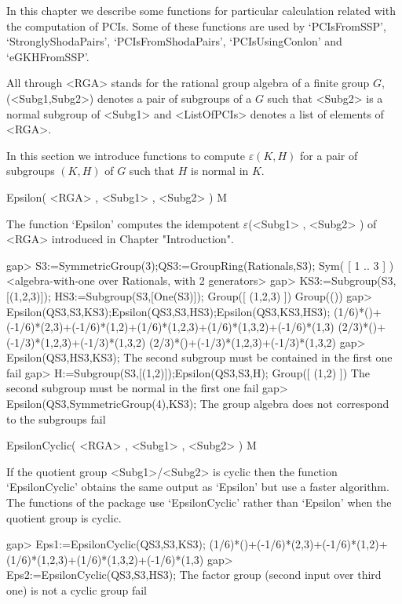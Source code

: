 
In this chapter we describe some functions for particular calculation 
related with the computation of PCIs. Some of these functions are used by 
`PCIsFromSSP', `StronglyShodaPairs', `PCIsFromShodaPairs', `PCIsUsingConlon' and `eGKHFromSSP'. 

All through <RGA> stands for the rational group algebra of a finite group $G$, (<Subg1,Subg2>) 
denotes a pair of subgroups of a $G$ such that <Subg2> is a normal subgroup of <Subg1> 
and <ListOfPCIs> denotes a list of elements of <RGA>. 



In this section we introduce functions to compute $\varepsilon(K,H)$ for a pair of subgroups 
$(K,H)$ of $G$ such that $H$ is normal in $K$. 

\>Epsilon( <RGA> , <Subg1> , <Subg2> ) M

The function `Epsilon' computes the idempotent $\varepsilon$(<Subg1> , <Subg2> ) of <RGA> 
introduced in Chapter "Introduction". 


\beginexample
    gap> S3:=SymmetricGroup(3);QS3:=GroupRing(Rationals,S3);
    Sym( [ 1 .. 3 ] )
    <algebra-with-one over Rationals, with 2 generators>
    gap> KS3:=Subgroup(S3,[(1,2,3)]); HS3:=Subgroup(S3,[One(S3)]);
    Group([ (1,2,3) ])
    Group(())
    gap> Epsilon(QS3,S3,KS3);Epsilon(QS3,S3,HS3);Epsilon(QS3,KS3,HS3);
    (1/6)*()+(-1/6)*(2,3)+(-1/6)*(1,2)+(1/6)*(1,2,3)+(1/6)*(1,3,2)+(-1/6)*(1,3)
    (2/3)*()+(-1/3)*(1,2,3)+(-1/3)*(1,3,2)
    (2/3)*()+(-1/3)*(1,2,3)+(-1/3)*(1,3,2)
    gap> Epsilon(QS3,HS3,KS3);
    The second subgroup must be contained in the first one
    fail
    gap> H:=Subgroup(S3,[(1,2)]);Epsilon(QS3,S3,H);
    Group([ (1,2) ])
    The second subgroup must be normal in the first one
    fail
    gap> Epsilon(QS3,SymmetricGroup(4),KS3);
    The group algebra does not correspond to the subgroups
    fail
\endexample


\>EpsilonCyclic( <RGA> , <Subg1> , <Subg2> ) M

If the quotient group <Subg1>/<Subg2> is cyclic then the function `EpsilonCyclic' 
obtains the same output as `Epsilon' but use a faster algorithm. 
The functions of the package use `EpsilonCyclic' rather than `Epsilon' 
when the quotient group is cyclic.

\beginexample
    gap> Eps1:=EpsilonCyclic(QS3,S3,KS3);
    (1/6)*()+(-1/6)*(2,3)+(-1/6)*(1,2)+(1/6)*(1,2,3)+(1/6)*(1,3,2)+(-1/6)*(1,3)
    gap> Eps2:=EpsilonCyclic(QS3,S3,HS3); 
    The factor group (second input over third one) is not a cyclic group
    fail
\endexample

